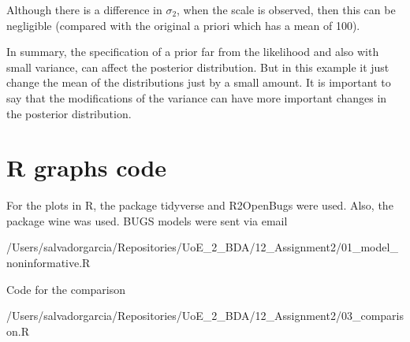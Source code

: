 \documentclass{article}
\begin{document}
Although there is a difference in $\sigma_2$, when the scale is observed, then this can be negligible (compared with the original a priori which has a mean of 100). 

In summary, the specification of a prior far from the likelihood and also with small variance, can affect the posterior distribution. But in this example it just change the mean of the distributions just by a small amount. It is important to say that the modifications of the variance can have more important changes in the posterior distribution.

\pagebreak
\appendix

\section{R graphs code}
For the plots in R, the package tidyverse and R2OpenBugs were used. Also, the package wine was used. BUGS models were sent via email


{/Users/salvadorgarcia/Repositories/UoE_2_BDA/12_Assignment2/01_model_noninformative.R}

Code for the comparison


{/Users/salvadorgarcia/Repositories/UoE_2_BDA/12_Assignment2/03_comparison.R}
\end{document}
